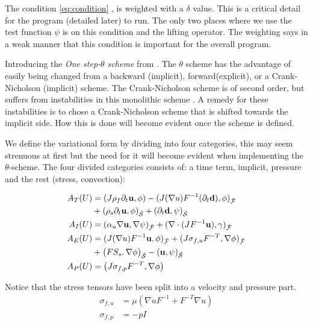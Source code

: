The condition \eqref{eq:condition} , is weighted with a $\delta$ value. This is a critical detail for the program (detailed later) to run. The only two places where we use the test function $\psi$ is on this condition and the lifting operator. The weighting says in a weak manner that this condition is important for the overall program. \newline

Introducing the \textit{One step-$\theta$ scheme} from \cite{Wick2011}. The $\theta$ scheme has the advantage of easily being changed from a backward (implicit), forward(explicit), or a Crank-Nicholson (implicit) scheme. The Crank-Nicholson scheme is of second order, but suffers from instabilities in this monolithic scheme \cite{Wick2011}. A remedy for these instabilities is to chose a Crank-Nicholson scheme that is shifted towards the implicit side. How this is done will become evident once the scheme is defined.

We define the variational form by dividing into four categories, this may seem strenuous at first but the need for it will become evident when implementing the $\theta$-scheme. The four divided categories consists of: a time term, implicit, pressure and the rest (stress, convection):

\begin{align}
A_T(U) &= (J \rho_f \partial_t \bold{u} , \phi ) - (J (\nabla u)F^{-1}(\partial_t \bold{d}) , \phi )_{\mathcal{\hat{F}}} \\
	    & + (\rho_s \partial_t \bold{u} , \phi)_{\mathcal{\hat{S}}} + (\partial_t \bold{d} , \psi)_{\mathcal{\hat{S}}}  \\
A_I(U) &= ( \alpha_u \nabla \bold{u}, \nabla \psi)_{\mathcal{\hat{F}}} + (\nabla \cdot (J F^{-1} \bold{u}), \gamma)_{\mathcal{\hat{F}}} \\
A_E(U) &= (J (\nabla u)F^{-1} \bold{u} , \phi )_{\mathcal{\hat{F}}} + ( J \sigma_{f,u} F^{-T} , \nabla \phi )_{\mathcal{\hat{F}}} \\
	    & + \big(F S_s, \nabla \phi \big)_{\mathcal{\hat{S}}} - ( \bold{u} , \psi )_{\mathcal{\hat{S}}} \\
A_P(U) &= \big( J \sigma_{f,p} F^{-T}, \nabla \phi  \big)  	 		
\end{align}

Notice that the stress tensors have been split into a velocity and pressure part. 
\begin{align}
\sigma_{f,u} &= \mu ( \nabla u F^{-1} + F^{-T} \nabla u) \\
\sigma_{f,p} &= -p I
\end{align}

